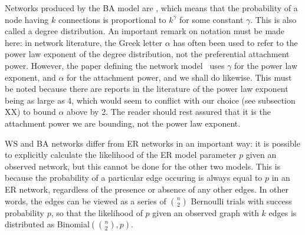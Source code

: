 Networks produced by the BA model are , which means that the
probability of a node having $k$ connections is proportional to $k^\gamma$ for
some constant $\gamma$. This is also called a  degree
distribution. An important remark on notation must be made here: in network
literature, the Greek letter $\alpha$ has often been used to refer to the power
law exponent of the degree distribution, not the preferential attachment power.
However, the paper defining the network model~\autocite{barabasi1999emergence}
uses $\gamma$ for the power law exponent, and $\alpha$ for the attachment
power, and we shall do likewise. This must be noted because there are reports
in the literature of the power law exponent being as large as 4, which would
seem to conflict with our choice (see subsection XX) to bound $\alpha$ above by
2. The reader should rest assured that it is the attachment power we are
bounding, not the power law exponent.

WS and BA networks differ from ER networks in an important way: it is possible
to explicitly calculate the likelihood of the ER model parameter $p$ given an
observed network, but this cannot be done for the other two models. This is
because the probability of a particular edge occuring is always equal to $p$ in
an ER network, regardless of the presence or absence of any other edges. In
other words, the edges can be viewed as a series of $\binom{n}{2}$ Bernoulli
trials with success probability $p$, so that the likelihood of $p$ given an
observed graph with $k$ edges is distributed as 
Binomial$\left(\binom{n}{2}, p\right)$.


